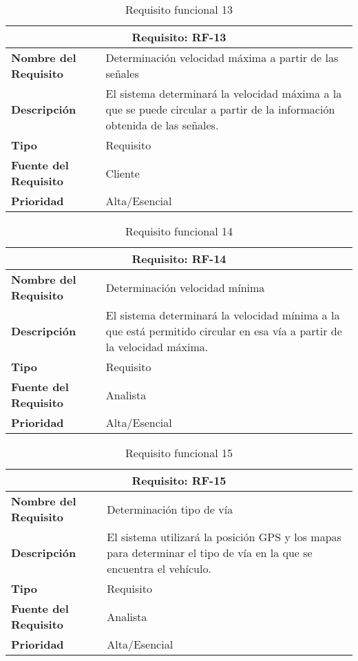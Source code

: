 \begin{table}[H]
\begin{center}
\begin{tabular}{p{} p{7cm}}
\multicolumn{2}{c}{\textbf{Requisito: RF-13} } \\
\hline \hline
\textbf{Nombre del Requisito} & Determinación velocidad máxima a partir de las señales \\
\hline
\textbf{Descripción} & El sistema determinará la velocidad máxima a la que se puede circular a partir de la información obtenida de las señales.\\
\hline
\textbf{Tipo} & Requisito \\
\hline
\textbf{Fuente del Requisito} & Cliente \\
\hline
\textbf{Prioridad} & Alta/Esencial \\ \hline
\end{tabular}
\caption{Requisito funcional 13}
\label{tab:RF-13}
\end{center}
\end{table}

\begin{table}[H]
\begin{center}
\begin{tabular}{p{} p{7cm}}
\multicolumn{2}{c}{\textbf{Requisito: RF-14} } \\
\hline \hline
\textbf{Nombre del Requisito} & Determinación velocidad mínima \\
\hline
\textbf{Descripción} &  El sistema determinará la velocidad mínima a la que está permitido circular en esa vía a partir de la velocidad máxima.\\
\hline
\textbf{Tipo} & Requisito \\
\hline
\textbf{Fuente del Requisito} & Analista \\
\hline
\textbf{Prioridad} & Alta/Esencial \\ \hline
\end{tabular}
\caption{Requisito funcional 14}
\label{tab:RF-14}
\end{center}
\end{table}

\begin{table}[H]
\begin{center}
\begin{tabular}{p{} p{7cm}}
\multicolumn{2}{c}{\textbf{Requisito: RF-15} } \\
\hline \hline
\textbf{Nombre del Requisito} & Determinación tipo de vía \\
\hline
\textbf{Descripción} & El sistema utilizará la posición GPS y los mapas para determinar el tipo de vía en la que se encuentra el vehículo. \\
\hline
\textbf{Tipo} & Requisito \\
\hline
\textbf{Fuente del Requisito} & Analista \\
\hline
\textbf{Prioridad} & Alta/Esencial \\ \hline
\end{tabular}
\caption{Requisito funcional 15}
\label{tab:RF-15}
\end{center}
\end{table}

